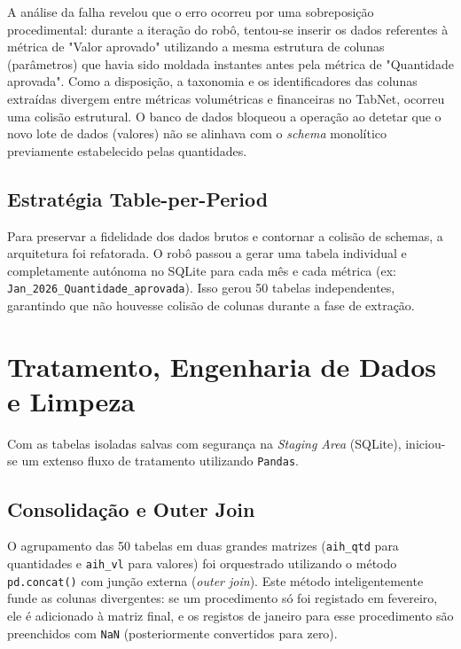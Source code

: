 \documentclass[12pt,a4paper]{report}
\begin{document}
A análise da falha revelou que o erro ocorreu por uma sobreposição procedimental: durante a iteração do robô, tentou-se inserir os dados referentes à métrica de "Valor aprovado" utilizando a mesma estrutura de colunas (parâmetros) que havia sido moldada instantes antes pela métrica de "Quantidade aprovada". Como a disposição, a taxonomia e os identificadores das colunas extraídas divergem entre métricas volumétricas e financeiras no TabNet, ocorreu uma colisão estrutural. O banco de dados bloqueou a operação ao detetar que o novo lote de dados (valores) não se alinhava com o \textit{schema} monolítico previamente estabelecido pelas quantidades.

\section{Estratégia Table-per-Period}
Para preservar a fidelidade dos dados brutos e contornar a colisão de schemas, a arquitetura foi refatorada. O robô passou a gerar uma tabela individual e completamente autónoma no SQLite para cada mês e cada métrica (ex: \texttt{Jan\_2026\_Quantidade\_aprovada}). Isso gerou 50 tabelas independentes, garantindo que não houvesse colisão de colunas durante a fase de extração.

\chapter{Tratamento, Engenharia de Dados e Limpeza}

Com as tabelas isoladas salvas com segurança na \textit{Staging Area} (SQLite), iniciou-se um extenso fluxo de tratamento utilizando \texttt{Pandas}.

\section{Consolidação e Outer Join}
O agrupamento das 50 tabelas em duas grandes matrizes (\texttt{aih\_qtd} para quantidades e \texttt{aih\_vl} para valores) foi orquestrado utilizando o método \texttt{pd.concat()} com junção externa (\textit{outer join}). Este método inteligentemente funde as colunas divergentes: se um procedimento só foi registado em fevereiro, ele é adicionado à matriz final, e os registos de janeiro para esse procedimento são preenchidos com \texttt{NaN} (posteriormente convertidos para zero).
\end{document}
